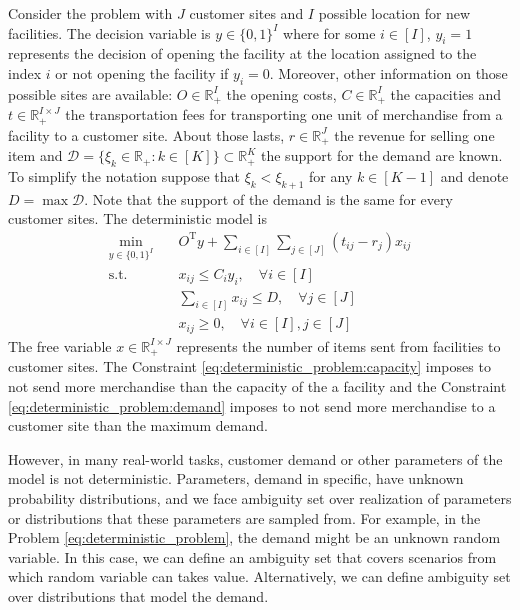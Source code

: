 \documentclass[12pt, letterpaper]{article}
\newcommand{\R}{\mathbb{R}}
\newcommand{\T}{\mathrm{T}}
\newcommand{\Dcal}{\mathcal{D}}
\begin{document}
	Consider the problem with $J$ customer sites and $I$ possible location for new facilities. The decision variable is $y \in \{0, 1\}^I$ where for some $i \in [I]$, $y_i = 1$ represents the decision of opening the facility at the location assigned to the index $i$ or not opening the facility if $y_i = 0$. Moreover, other information on those possible sites are available: $O \in \R_+^I$ the opening costs, $C \in \R_+^I$ the capacities and $t \in \R_+^{I \times J}$ the transportation fees for transporting one unit of merchandise from a facility to a customer site. About those lasts, $r \in \R_+^J$ the revenue for selling one item and $\Dcal = \{\xi_k \in \R_+: k \in [K]\} \subset \R_+^K$ the support for the demand are known. To simplify the notation suppose that $\xi_k < \xi_{k+1}$ for any $k \in [K-1]$ and denote $D = \max \Dcal$. Note that the support of the demand is the same for every customer sites. The deterministic model is
	\begin{subequations} \label{eq:deterministic_problem}
		\begin{align}
			\min_{y \in \{0, 1\}^I} &\quad O^\T y + \sum_{i \in [I]} \sum_{j \in [J]} (t_{ij} - r_j) x_{ij} \\
			\text{s.t.} &\quad x_{ij} \le C_i y_i, \quad \forall i \in [I] \\ \label{eq:deterministic_problem:capacity}
			&\quad \sum_{i \in [I]} x_{ij} \le D, \quad \forall j \in [J] \\ \label{eq:deterministic_problem:demand}
			&\quad x_{ij} \ge 0, \quad \forall i \in [I], j \in [J]
		\end{align}
	\end{subequations}
	The free variable $x \in \R_+^{I \times J}$ represents the number of items sent from facilities to customer sites. The Constraint \eqref{eq:deterministic_problem:capacity} imposes to not send more merchandise than the capacity of the a facility and the Constraint \eqref{eq:deterministic_problem:demand} imposes to not send more merchandise to a customer site than the maximum demand.
	
	However, in many real-world tasks, customer demand or other parameters of the model is not deterministic. Parameters, demand in specific, have unknown probability distributions, and we face ambiguity set over realization of parameters or distributions that these parameters are sampled from. For example, in the Problem \eqref{eq:deterministic_problem}, the demand might be an unknown random variable. In this case, we can define an ambiguity set that covers scenarios from which random variable can takes value. Alternatively, we can define ambiguity set over distributions that model the demand.
	
\end{document}
